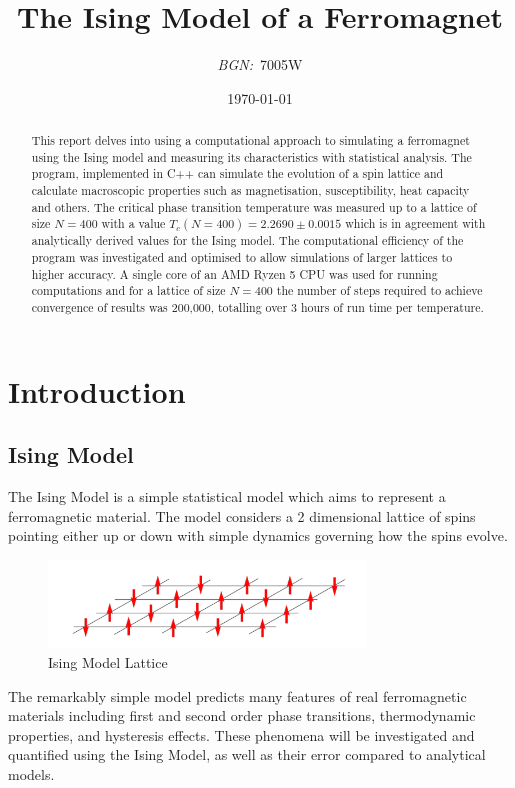 \documentclass[a4paper, 12pt]{article}
\institute{Cambridge University}
\title{The Ising Model of a Ferromagnet}
\author{\textit{BGN:}\ \textsc{7005W}}
\date{\today}
\begin{document}
    \maketitle
    
        \begin{abstract}
    This report delves into using a computational approach to simulating a ferromagnet using the Ising model and measuring its characteristics with statistical analysis. The program, implemented in C++ can simulate the evolution of a spin lattice and calculate macroscopic properties such as magnetisation, susceptibility, heat capacity and others. The critical phase transition temperature was measured up to a lattice of size \(N = 400\) with a value \(T_c(N=400) = 2.2690 \pm 0.0015 \) which is in agreement with analytically derived values for the Ising model. The computational efficiency of the program was investigated and optimised to allow simulations of larger lattices to higher accuracy. A single core of an AMD Ryzen 5 CPU was used for running computations and for a lattice of size \(N=400 \) the number of steps required to achieve convergence of results was 200,000, totalling over 3 hours of run time per temperature. 
    \end{abstract}
    
    \romantableofcontents
    
    \section{Introduction}
    \subsection{Ising Model}
	The Ising Model is a simple statistical model which aims to represent a ferromagnetic material. The model considers a 2 dimensional lattice of spins pointing either up or down with simple dynamics governing how the spins evolve.	
\begin{figure}[H]
\centering
\includegraphics[width=0.75\textwidth]{./resources/ising_model.png}
\caption{Ising Model Lattice}
\end{figure}
The remarkably simple model predicts many features of real ferromagnetic materials including first and second order phase transitions, thermodynamic properties, and hysteresis effects. These phenomena will be investigated and quantified using the Ising Model, as well as their error compared to analytical models.
\end{document}
